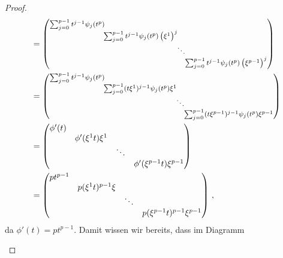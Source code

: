 \begin{proof}
\begin{align*}
  &=
{
  \footnotesize
  \begin{pmatrix}\sum_{j=0}^{p-1}t^{j-1}\psi_{j}(t^p)\!\!\!\!\\
    & \!\!\!\!\sum_{j=0}^{p-1}t^{j-1}\psi_{j}(t^p)\left(\xi^{1}\right)^{j}\!\!\!\!\\
    & & \!\!\!\!\ddots\!\!\!\!\\
    &  &  & \!\!\!\!\sum_{j=0}^{p-1}t^{j-1}\psi_{j}(t^p)\left(\xi^{p-1}\right)^{j}
  \end{pmatrix}
}\\
  &=
{
  \footnotesize
  \begin{pmatrix}\sum_{j=0}^{p-1}t^{j-1}\psi_{j}(t^p)\!\!\!\!\\
    & \!\!\!\!\sum_{j=0}^{p-1}(t\xi^1)^{j-1}\psi_{j}(t^p)\xi^{1}\!\!\!\!\\
    & & \!\!\!\!\ddots\!\!\!\!\\
    &  &  & \!\!\!\!\sum_{j=0}^{p-1}(t\xi^{p-1})^{j-1}\psi_{j}(t^p)\xi^{p-1}
  \end{pmatrix}
}\\
  &= \begin{pmatrix}\phi'(t)\\
    & \phi'(\xi^1 t)\xi^{1}\\
    & & \ddots\\
    &  &  & \phi'(\xi^{p-1} t)\xi^{p-1}
  \end{pmatrix}\\
  &= \begin{pmatrix} pt^{p-1}\\
    & p(\xi^1 t)^{p-1}\xi\\
    & & \ddots\\
    &  &  & p(\xi^{p-1} t)^{p-1}\xi^{p-1}
  \end{pmatrix}
  \,,
\end{align*}
da $\phi'(t)=pt^{p-1}$.
Damit wissen wir bereits, dass im Diagramm
\begin{center}
\end{center}
\end{proof}

